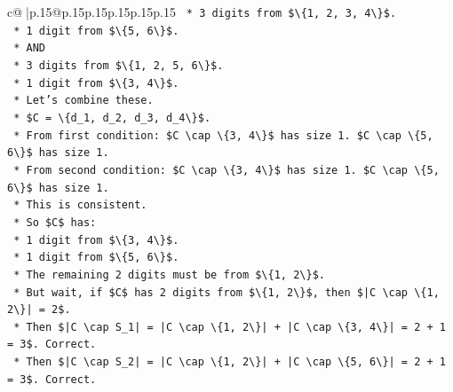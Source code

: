\documentclass{article}
\begin{document}
{\begin{supertabular}{c@{$\;$}|p{.15\linewidth}@{}p{.15\linewidth}p{.15\linewidth}p{.15\linewidth}p{.15\linewidth}p{.15\linewidth}}
{{{\texttt{            *   3 digits from \$\textbackslash{}\{1, 2, 3, 4\textbackslash{}\}\$.} \\
\texttt{            *   1 digit from \$\textbackslash{}\{5, 6\textbackslash{}\}\$.} \\
\texttt{        *   AND} \\
\texttt{            *   3 digits from \$\textbackslash{}\{1, 2, 5, 6\textbackslash{}\}\$.} \\
\texttt{            *   1 digit from \$\textbackslash{}\{3, 4\textbackslash{}\}\$.} \\
\texttt{        *   Let's combine these.} \\
\texttt{        *   \$C = \textbackslash{}\{d\_1, d\_2, d\_3, d\_4\textbackslash{}\}\$.} \\
\texttt{        *   From first condition: \$C \textbackslash{}cap \textbackslash{}\{3, 4\textbackslash{}\}\$ has size 1. \$C \textbackslash{}cap \textbackslash{}\{5, 6\textbackslash{}\}\$ has size 1.} \\
\texttt{        *   From second condition: \$C \textbackslash{}cap \textbackslash{}\{3, 4\textbackslash{}\}\$ has size 1. \$C \textbackslash{}cap \textbackslash{}\{5, 6\textbackslash{}\}\$ has size 1.} \\
\texttt{        *   This is consistent.} \\
\texttt{        *   So \$C\$ has:} \\
\texttt{            *   1 digit from \$\textbackslash{}\{3, 4\textbackslash{}\}\$.} \\
\texttt{            *   1 digit from \$\textbackslash{}\{5, 6\textbackslash{}\}\$.} \\
\texttt{            *   The remaining 2 digits must be from \$\textbackslash{}\{1, 2\textbackslash{}\}\$.} \\
\texttt{        *   But wait, if \$C\$ has 2 digits from \$\textbackslash{}\{1, 2\textbackslash{}\}\$, then \$|C \textbackslash{}cap \textbackslash{}\{1, 2\textbackslash{}\}| = 2\$.} \\
\texttt{        *   Then \$|C \textbackslash{}cap S\_1| = |C \textbackslash{}cap \textbackslash{}\{1, 2\textbackslash{}\}| + |C \textbackslash{}cap \textbackslash{}\{3, 4\textbackslash{}\}| = 2 + 1 = 3\$. Correct.} \\
\texttt{        *   Then \$|C \textbackslash{}cap S\_2| = |C \textbackslash{}cap \textbackslash{}\{1, 2\textbackslash{}\}| + |C \textbackslash{}cap \textbackslash{}\{5, 6\textbackslash{}\}| = 2 + 1 = 3\$. Correct.} \\
}}}
\end{supertabular}}
\end{document}
